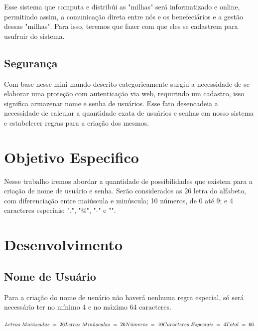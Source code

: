\documentclass[]{article}
\begin{document}
Esse sistema que computa e distribúi as "milhas" será informatizado e online, permitindo assim, a comunicação direta entre nós e os benefeciários e a gestão dessas "milhas". Para isso, teremos que fazer com que eles se cadastrem para usufruir do sistema.

\subsection{Segurança}
Com base nesse mini-mundo descrito categoricamente surgiu a necessidade de se elaborar uma proteção com autenticação via web, requirindo um cadastro, isso significa armazenar nome e senha de usuários. Esse fato desencadeia a necessidade de calcular a quantidade exata de usuários e senhas em nosso sistema e estabelecer regras para a criação dos mesmos.
 
\section{Objetivo Especifico}
 Nesse trabalho iremos abordar a quantidade de possibilidades que existem para a criação de nome de usuário e senha. Serão considerados as 26 letra do alfabeto, com diferenciação entre maiúscula e minúscula; 10 números, de 0 até 9; e 4 caracteres especiais: ".", "@", "\--" e "\textunderscore".
 
 \section{Desenvolvimento}

 \subsection{Nome de Usuário}
 
 Para a criação do nome de usuário não haverá nenhuma regra especial, só será necessário ter no mínimo 4 e no máximo 64 caracteres.
 
 \begin{math}
 \\Letras\;Mai\acute{u}sculas\;=\;26
 \\Letras\;Min\acute{u}sculas\;=\;26
 \\N\acute{u}meros\;=\;10
 \\Caracteres\;Especiais\;=\;4
 \\Total\;=\;66
 \end{math}
 
\end{document}

